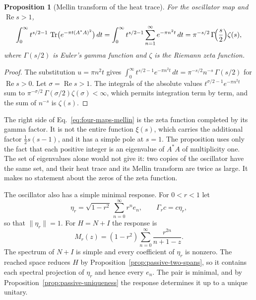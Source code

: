 \documentclass[11pt]{article}
\newtheorem{proposition}{Proposition}[section]
\theoremstyle{definition}
\DeclareMathOperator{\Tr}{Tr}
\begin{document}
\begin{proposition}[Mellin transform of the heat trace]
\label{prop:four-maps-mellin}
For the oscillator map and $\operatorname{Re}s>1$,
\begin{equation}
 \int_0^\infty t^{s/2-1}\,\Tr\bigl(e^{-\pi t(A^*A)^2}\bigr)\,dt
   =\int_0^\infty t^{s/2-1}\sum_{n=1}^\infty e^{-\pi n^2t}\,dt
   =\pi^{-s/2}\,\Gamma\!\Bigl(\frac s2\Bigr)\zeta(s),
 \label{eq:four-maps-mellin}
\end{equation}
where $\Gamma(s/2)$ is Euler's gamma function and $\zeta$ is the Riemann zeta function.
\end{proposition}
\begin{proof}
The substitution $u=\pi n^2t$ gives $\int_0^\infty t^{s/2-1}e^{-\pi n^2t}\,dt=\pi^{-s/2}n^{-s}\,\Gamma(s/2)$ for $\operatorname{Re}s>0$. Let $\sigma=\operatorname{Re}s>1$. The integrals of the absolute values $t^{\sigma/2-1}e^{-\pi n^2t}$ sum to $\pi^{-\sigma/2}\,\Gamma(\sigma/2)\zeta(\sigma)<\infty$, which permits integration term by term, and the sum of $n^{-s}$ is $\zeta(s)$.
\end{proof}

The right side of Eq.~\eqref{eq:four-maps-mellin} is the zeta function completed by its gamma factor. It is not the entire function $\xi(s)$, which carries the additional factor $\frac12s(s-1)$, and it has a simple pole at $s=1$. The proposition uses only the fact that each positive integer is an eigenvalue of $A^*A$ of multiplicity one. The set of eigenvalues alone would not give it: two copies of the oscillator have the same set, and their heat trace and its Mellin transform are twice as large. It makes no statement about the zeros of the zeta function.

The oscillator also has a simple minimal response. For $0<r<1$ let
\begin{equation}
 \eta_r=\sqrt{1-r^2}\,\sum_{n=0}^\infty r^ne_n,\qquad\Gamma_rc=c\eta_r ,
 \label{eq:four-maps-oscillator-port}
\end{equation}
so that $\|\eta_r\|=1$. For $H=N+I$ the response is
\begin{equation}
 M_r(z)=(1-r^2)\sum_{n=0}^\infty\frac{r^{2n}}{n+1-z}.
 \label{eq:four-maps-oscillator-response}
\end{equation}
The spectrum of $N+I$ is simple and every coefficient of $\eta_r$ is nonzero. The reached space reduces $H$ by Proposition~\ref{prop:passive-two-spans}, so it contains each spectral projection of $\eta_r$ and hence every $e_n$. The pair is minimal, and by Proposition~\ref{prop:passive-uniqueness} the response determines it up to a unique unitary.
\end{document}
